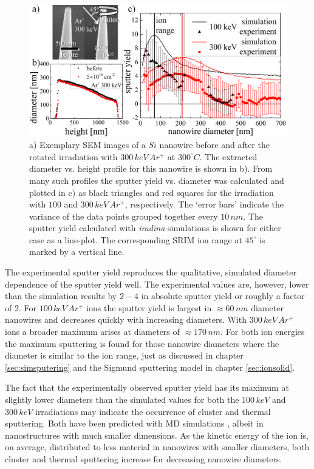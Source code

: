 \begin{figure}[th]
	\centering
		\includegraphics[width=.95\textwidth]{images/sputter_exp.png}
	\caption{a) Exemplary SEM images of a $Si$ nanowire before and after the rotated irradiation with $300\,keV\,Ar^+$ at $300^\circ C$. The extracted diameter vs. height profile for this nanowire is shown in b). From many such profiles the sputter yield vs. diameter was calculated and plotted in c) as black triangles and red squares for the irradiation with $100$ and $300\,keV\,Ar^+$, respectively. The `error bars' indicate the variance of the data points grouped together every $10\,nm$. The sputter yield calculated with \emph{iradina} simulations is shown for either case as a line-plot. The corresponding SRIM ion range at $45^\circ$ is marked by a vertical line.} 
	\label{sputtering_exp}
\end{figure} 

The experimental sputter yield reproduces the qualitative, simulated diameter dependence of the sputter yield well. The experimental values are, however, lower than the simulation results by $2-4$ in absolute sputter yield or roughly a factor of 2. For $100\,keV\,Ar^+$ ions the sputter yield is largest in $\approx 60\,nm$ diameter nanowires and decreases quickly with increasing diameters. With $300\,keV\,Ar^+$ ions a broader maximum arises at diameters of $\approx 170\,nm$. For both ion energies the maximum sputtering is found for those nanowire diameters where the diameter is similar to the ion range, just as discussed in chapter \ref{sec:simsputering} and the Sigmund sputtering model in chapter \ref{sec:ionsolid}.   

The fact that the experimentally observed sputter yield has its maximum at slightly lower diameters than the simulated values for both the $100\,keV$ and $300\,keV$ irradiations may indicate the occurrence of cluster and thermal sputtering. Both have been predicted with MD simulations \cite{nietiadi_sputtering_2014,urbassek_sputter_2015,anders_sputtering_2015}, albeit in nanostructures with much smaller dimensions. As the kinetic energy of the ion is, on average, distributed to less material in nanowires with smaller diameters, both cluster and thermal sputtering increase for decreasing nanowire diameters.

